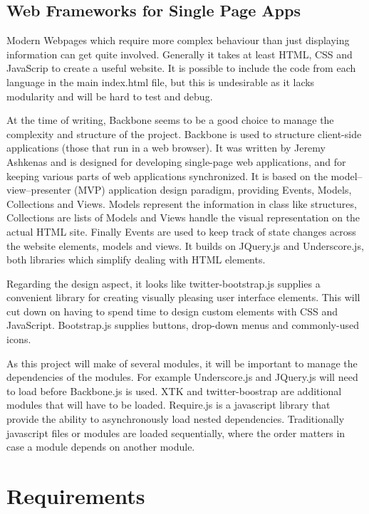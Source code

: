 \documentclass[a4paper,11pt,titlepage]{article}
\begin{document}
\subsection{Web Frameworks for Single Page Apps}


Modern Webpages which require more complex behaviour than just displaying information can get quite involved. Generally it takes at least HTML, CSS and JavaScrip to create a useful website. It is possible to include the code from each language in the main index.html file, but this is undesirable as it lacks modularity and will be hard to test and debug.

At the time of writing, Backbone seems to be a good choice to manage the complexity and structure of the project. Backbone is used to structure client-side applications (those that run in a web browser). It was written by Jeremy Ashkenas and is designed for developing single-page web applications, and for keeping various parts of web applications synchronized. It is based on the model–view–presenter (MVP) application design paradigm, providing Events, Models, Collections and Views. Models represent the information in class like structures, Collections are lists of Models and Views handle the visual representation on the actual HTML site. Finally Events are used to keep track of state changes across the website elements, models and views. It builds on JQuery.js and Underscore.js, both libraries which simplify dealing with HTML elements.

Regarding the design aspect, it looks like twitter-bootstrap.js supplies a convenient library for creating visually pleasing user interface elements. This will cut down on having to spend time to design custom elements with CSS and JavaScript. Bootstrap.js supplies buttons, drop-down menus and commonly-used icons.

As this project will make of several modules, it will be important to manage the dependencies of the modules. For example Underscore.js and JQuery.js will need to load before Backbone.js is used. XTK and twitter-boostrap are additional modules that will have to be loaded. Require.js is a javascript library that provide the ability to asynchronously load nested dependencies. Traditionally javascript files or modules are loaded sequentially, where the order matters in case a module depends on another module.




\section{Requirements}
\end{document}
